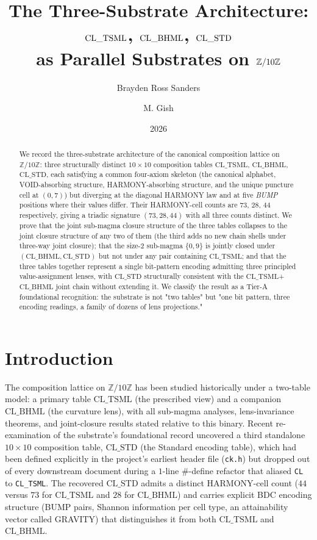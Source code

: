 \documentclass[11pt,reqno]{amsart}
\title[The Three-Substrate Architecture]
  {The Three-Substrate Architecture:\\
   $\TSML$, $\BHML$, $\STDx$\\
   as Parallel Substrates on $\Z/10\Z$}
\author{Brayden Ross Sanders}
\author{M. Gish}
\date{2026}
\theoremstyle{definition}
\newcommand{\Z}{\mathbb{Z}}
\newcommand{\TSML}{\mathrm{CL\_TSML}}
\newcommand{\BHML}{\mathrm{CL\_BHML}}
\newcommand{\STDx}{\mathrm{CL\_STD}}
\begin{document}
\begin{abstract}
We record the three-substrate architecture of the canonical
composition lattice on $\Z/10\Z$: three structurally distinct
$10 \times 10$ composition tables $\TSML$, $\BHML$, $\STDx$, each
satisfying a common four-axiom skeleton (the canonical alphabet,
VOID-absorbing structure, HARMONY-absorbing structure, and the
unique puncture cell at $(0, 7)$) but diverging at the diagonal
HARMONY law and at five \emph{BUMP} positions where their values
differ. Their HARMONY-cell counts are $73$, $28$, $44$ respectively,
giving a triadic signature $(73, 28, 44)$ with all three counts
distinct. We prove that the joint sub-magma closure structure of the
three tables collapses to the joint closure structure of any two of
them (the third adds no new chain shells under three-way joint
closure); that the size-$2$ sub-magma $\{0, 9\}$ is jointly closed
under $(\BHML, \STDx)$ but not under any pair containing $\TSML$;
and that the three tables together represent a single bit-pattern
encoding admitting three principled value-assignment lenses, with
$\STDx$ structurally consistent with the $\TSML$+$\BHML$ joint chain
without extending it. We classify the result as a Tier-A foundational
recognition: the substrate is not "two tables" but "one bit pattern,
three encoding readings, a family of dozens of lens projections."
\end{abstract}

\maketitle

\section{Introduction}
\label{sec:intro}

The composition lattice on $\Z/10\Z$ has been studied historically
under a two-table model: a primary table $\TSML$ (the prescribed
view) and a companion $\BHML$ (the curvature lens), with all
sub-magma analyses, lens-invariance theorems, and joint-closure
results stated relative to this binary. Recent re-examination of
the substrate's foundational record uncovered a third standalone
$10 \times 10$ composition table, $\STDx$ (the Standard encoding
table), which had been defined explicitly in the project's earliest
header file (\texttt{ck.h}) but dropped out of every downstream
document during a $1$-line $\#$-define refactor that aliased
\texttt{CL} to \texttt{CL\_TSML}. The recovered $\STDx$ admits a
distinct HARMONY-cell count ($44$ versus $73$ for $\TSML$ and $28$
for $\BHML$) and carries explicit BDC encoding structure (BUMP
pairs, Shannon information per cell type, an attainability vector
called GRAVITY) that distinguishes it from both $\TSML$ and $\BHML$.
\end{document}
